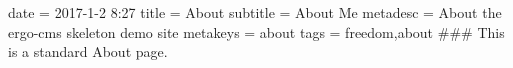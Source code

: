 date = 2017-1-2 8:27
title = About
subtitle = About Me
metadesc = About the ergo-cms skeleton demo site
metakeys = about
tags = freedom,about
###
This is a standard About page. 